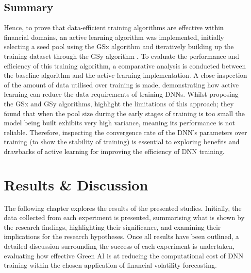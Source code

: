 \documentclass[a4paper, 11pt]{report}
\begin{document}
    \section{Summary}

    Hence, to prove that data-efficient training algorithms are effective within financial domains, an active learning algorithm was implemented, initially selecting a seed pool using the GSx algorithm and iteratively building up the training dataset through the GSy algorithm \citep{wu-2019}. To evaluate the performance and efficiency of this training algorithm, a comparative analysis is conducted between the baseline algorithm and the active learning implementation. A close inspection of the amount of data utilised over training is made, demonstrating how active learning can reduce the data requirements of training DNNs. Whilst proposing the GSx and GSy algorithms, \citet{wu-2019} highlight the limitations of this approach; they found that when the pool size during the early stages of training is too small the model being built exhibits very high variance, meaning its performance is not reliable. Therefore, inspecting the convergence rate of the DNN's parameters over training (to show the stability of training) is essential to exploring benefits and drawbacks of active learning for improving the efficiency of DNN training.


    \newpage
    \chapter{Results \& Discussion}
    \label{chapter: results-discussion}

    The following chapter explores the results of the presented studies. Initially, the data collected from each experiment is presented, summarising what is shown by the research findings, highlighting their significance, and examining their implications for the research hypotheses. Once all results have been outlined, a detailed discussion surrounding the success of each experiment is undertaken, evaluating how effective Green AI is at reducing the computational cost of DNN training within the chosen application of financial volatility forecasting.
    
\end{document}
